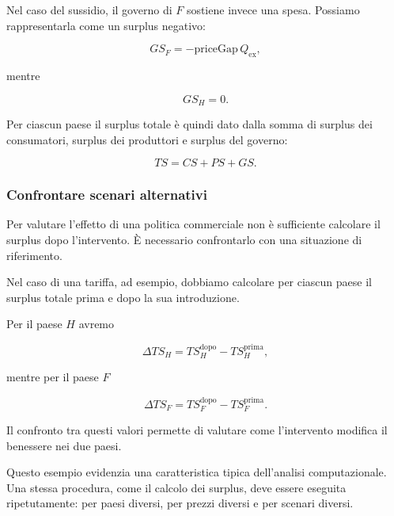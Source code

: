 Nel caso del sussidio, il governo di $F$ sostiene invece una spesa.
Possiamo rappresentarla come un surplus negativo:

\begin{equation*}
    GS_F
    =
    -\mathrm{priceGap}\,Q_{\mathrm{ex}},
\end{equation*}

mentre

\begin{equation*}
    GS_H=0.
\end{equation*}

Per ciascun paese il surplus totale è quindi dato dalla somma di
surplus dei consumatori, surplus dei produttori e surplus del
governo:

\begin{equation*}
    TS=CS+PS+GS.
    \label{eq:total-surplus-trade}
\end{equation*}


\subsubsection{Confrontare scenari alternativi}

Per valutare l'effetto di una politica commerciale non è sufficiente
calcolare il surplus dopo l'intervento. È necessario confrontarlo
con una situazione di riferimento.

Nel caso di una tariffa, ad esempio, dobbiamo calcolare per ciascun
paese il surplus totale prima e dopo la sua introduzione.

Per il paese $H$ avremo

\begin{equation*}
    \Delta TS_H
    =
    TS_H^{\mathrm{dopo}}
    -
    TS_H^{\mathrm{prima}},
\end{equation*}

mentre per il paese $F$

\begin{equation*}
    \Delta TS_F
    =
    TS_F^{\mathrm{dopo}}
    -
    TS_F^{\mathrm{prima}}.
\end{equation*}

Il confronto tra questi valori permette di valutare come
l'intervento modifica il benessere nei due paesi.

Questo esempio evidenzia una caratteristica tipica dell'analisi
computazionale. Una stessa procedura, come il calcolo dei surplus,
deve essere eseguita ripetutamente: per paesi diversi, per prezzi
diversi e per scenari diversi.

